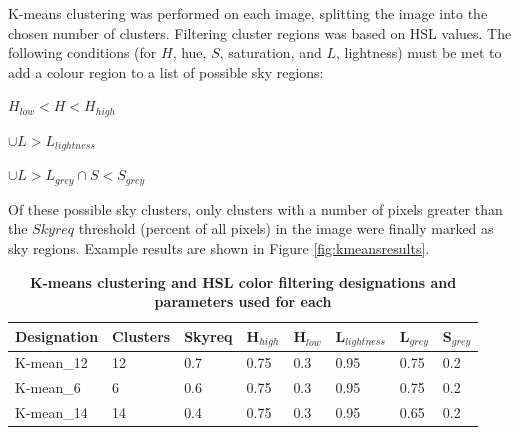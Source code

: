 \documentclass[final,3p,times,authoryear]{elsarticle}
\begin{document}
K-means clustering was performed on each image, splitting the image into the chosen number of clusters. Filtering cluster regions was based on HSL values. The following conditions (for $H$, hue, $S$, saturation, and $L$, lightness) must be met to add a colour region to a list of possible sky regions: 

$H_{low} < H < H_{high}$

$\cup L > L_{lightness}$

$\cup L > L_{grey} \cap S < S_{grey}$

Of these possible sky clusters, only clusters with a number of pixels greater than the $Skyreq$ threshold (percent of all pixels) in the image were finally marked as sky regions. Example results are shown in Figure \ref{fig:kmeansresults}. 

\begin{table}[!htbp]
\caption{\bf K-means clustering and HSL color filtering designations and parameters used for each \label{tab:techniques3}}     
\begin{tabular}{ l l l l l l l l}
\textbf{Designation} & \textbf{Clusters} & \textbf{Skyreq}&\textbf{H$_{high}$}&\textbf{H$_{low}$} & \textbf{L$_{lightness}$} & \textbf{L$_{grey}$}& \textbf{S$_{grey}$} \\ \hline
K-mean\_12  & 12 & 0.7& 0.75& 0.3 & 0.95 & 0.75 & 0.2 \\
K-mean\_6  & 6 & 0.6& 0.75& 0.3 & 0.95 & 0.75 & 0.2 \\
K-mean\_14  & 14 & 0.4& 0.75& 0.3 & 0.95 & 0.65 & 0.2 \\
\hline
\end{tabular}
\end{table}
\end{document}
